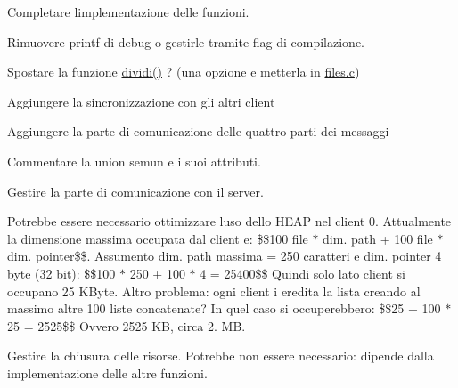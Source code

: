 
\begin{DoxyRefList}
\item[\label{todo__todo000001}%
\Hypertarget{todo__todo000001}%
File \hyperlink{client_8c}{client.c} ]Completare l\textquotesingle{}implementazione delle funzioni. 

Rimuovere printf di debug o gestirle tramite flag di compilazione. 

Spostare la funzione \hyperlink{client_8c_a55586f2b7e9b3620294cf78cda8abdad}{dividi()} ? (una opzione e\textquotesingle{} metterla in \hyperlink{files_8c}{files.\+c}) 
\item[\label{todo__todo000005}%
\Hypertarget{todo__todo000005}%
Globale \hyperlink{client_8h_a54b47b58f228d7bc9827d2919687e25a}{operazioni\+\_\+figlio} (char $\ast$file\+Path)]Aggiungere la sincronizzazione con gli altri client

Aggiungere la parte di comunicazione delle quattro parti dei messaggi 
\item[\label{todo__todo000007}%
\Hypertarget{todo__todo000007}%
Classe \hyperlink{unionsemun}{semun} ]Commentare la union semun e i suoi attributi.  
\item[\label{todo__todo000002}%
\Hypertarget{todo__todo000002}%
Globale \hyperlink{client_8h_a48d605ff689f470746c858648f0a98c2}{S\+I\+G\+I\+N\+T\+Signal\+Handler} (int sig)]Gestire la parte di comunicazione con il server.

Potrebbe essere necessario ottimizzare l\textquotesingle{}uso dello H\+E\+AP nel client 0. Attualmente la dimensione massima occupata dal client e\textquotesingle{}\+: \$\$100 file $\ast$ dim. path + 100 file $\ast$ dim. pointer\$\$. Assumento dim. path massima = 250 caratteri e dim. pointer 4 byte (32 bit)\+: \$\$100 $\ast$ 250 + 100 $\ast$ 4 = 25400\$\$ Quindi solo lato client si occupano 25 K\+Byte. Altro problema\+: ogni client i eredita la lista creando al massimo altre 100 liste concatenate? In quel caso si occuperebbero\+: \$\$25 + 100 $\ast$ 25 = 2525\$\$ Ovvero 2525 KB, circa 2. MB. 
\item[\label{todo__todo000004}%
\Hypertarget{todo__todo000004}%
Globale \hyperlink{client_8h_a50b22adcb76198fcd9402a97ff4711bf}{S\+I\+G\+U\+S\+R1\+Signal\+Handler} (int sig)]Gestire la chiusura delle risorse. Potrebbe non essere necessario\+: dipende dalla implementazione delle altre funzioni.
\end{DoxyRefList}